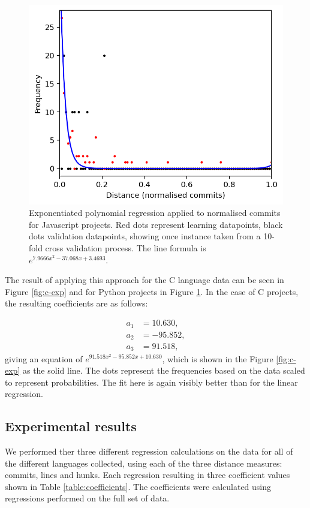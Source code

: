 \documentclass[pdflatex, sn-mathphys, referee]{sn-jnl}%
\theoremstyle{thmstyleone}%
\theoremstyle{thmstyletwo}%
\theoremstyle{thmstylethree}%
\theoremstyle{thmstyleone}
\begin{document}
\begin{figure}[t]
\centering
\includegraphics[width=0.7\columnwidth]{Fig16}%
\caption{\label{fig:javascript-exp}Exponentiated polynomial regression applied to normalised commits for Javascript projects. Red dots represent learning datapoints, black dots validation datapoints, showing once instance taken from a 10-fold cross validation process. The line formula is $e^{7.9666 x^{2} - 37.068 x + 3.4693}$.}
\end{figure}

The result of applying this approach for the C language data can be seen in Figure \ref{fig:c-exp} and for Python projects in Figure \ref{fig:javascript-exp}. In the case of C projects, the resulting coefficients are as follows:

\begin{align*}
a_1 & = 10.630, \\
a_2 & = -95.852, \\
a_3 & = 91.518,
\end{align*}
giving an equation of $e^{91.518 x^{2} - 95.852 x + 10.630}$, which is shown in the Figure \ref{fig:c-exp} as the solid line. The dots represent the frequencies based on the data scaled to represent probabilities. The fit here is again visibly better than for the linear regression.

\subsection{Experimental results}

We performed ther three different regression calculations on the data for all of the different languages collected, using each of the three distance measures: commits, lines and hunks. Each regression resulting in three coefficient values shown in Table \ref{table:coefficients}. The coefficients were calculated using regressions performed on the full set of data.
\end{document}
